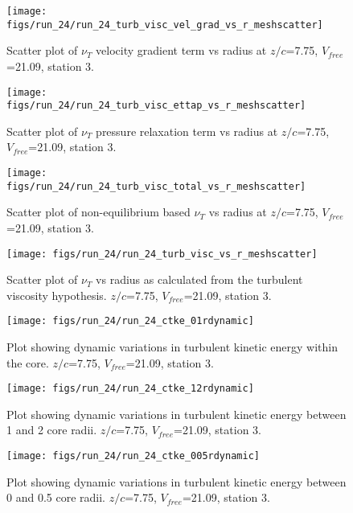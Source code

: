 \begin{figure}[H]
\centering
\texttt{[image: figs/run\_24/run\_24\_turb\_visc\_vel\_grad\_vs\_r\_meshscatter]}
\caption{Scatter plot of $\nu_T$ velocity gradient term vs radius at $z/c$=7.75, $V_{free}$=21.09, station 3.}
\end{figure}


\begin{figure}[H]
\centering
\texttt{[image: figs/run\_24/run\_24\_turb\_visc\_ettap\_vs\_r\_meshscatter]}
\caption{Scatter plot of $\nu_T$ pressure relaxation term vs radius at $z/c$=7.75, $V_{free}$=21.09, station 3.}
\end{figure}


\begin{figure}[H]
\centering
\texttt{[image: figs/run\_24/run\_24\_turb\_visc\_total\_vs\_r\_meshscatter]}
\caption{Scatter plot of non-equilibrium based $\nu_T$ vs radius at $z/c$=7.75, $V_{free}$=21.09, station 3.}
\end{figure}


\begin{figure}[H]
\centering
\texttt{[image: figs/run\_24/run\_24\_turb\_visc\_vs\_r\_meshscatter]}
\caption{Scatter plot of $\nu_T$ vs radius as calculated from the turbulent viscosity hypothesis. $z/c$=7.75, $V_{free}$=21.09, station 3.}
\end{figure}


\begin{figure}[H]
\centering
\texttt{[image: figs/run\_24/run\_24\_ctke\_01rdynamic]}
\caption{Plot showing dynamic variations in turbulent kinetic energy within the core. $z/c$=7.75, $V_{free}$=21.09, station 3.}
\end{figure}


\begin{figure}[H]
\centering
\texttt{[image: figs/run\_24/run\_24\_ctke\_12rdynamic]}
\caption{Plot showing dynamic variations in turbulent kinetic energy between 1 and 2 core radii. $z/c$=7.75, $V_{free}$=21.09, station 3.}
\end{figure}


\begin{figure}[H]
\centering
\texttt{[image: figs/run\_24/run\_24\_ctke\_005rdynamic]}
\caption{Plot showing dynamic variations in turbulent kinetic energy between 0 and 0.5 core radii. $z/c$=7.75, $V_{free}$=21.09, station 3.}
\end{figure}



